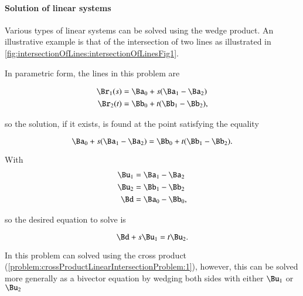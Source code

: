 
\paragraph{Solution of linear systems}

Various types of linear systems can be solved using the wedge product.
An illustrative example is that of the intersection of two lines as illustrated in \cref{fig:intersectionOfLines:intersectionOfLinesFig1}.


In parametric form, the lines in this problem are

\begin{dmath}\label{eqn:SimpleProducts2:1000}
\begin{aligned}
\Br_1(s) &= \Ba_0 + s( \Ba_1 - \Ba_2 ) \\
\Br_2(t) &= \Bb_0 + t( \Bb_1 - \Bb_2 ),
\end{aligned}
\end{dmath}

so the solution, if it exists, is found at the point satisfying the equality

\begin{dmath}\label{eqn:SimpleProducts2:1020}
\Ba_0 + s( \Ba_1 - \Ba_2 ) = \Bb_0 + t( \Bb_1 - \Bb_2 ).
\end{dmath}

With
\begin{dmath}\label{eqn:SimpleProducts2:1040}
\begin{aligned}
\Bu_1 &= \Ba_1 - \Ba_2 \\
\Bu_2 &= \Bb_1 - \Bb_2 \\
\Bd &= \Ba_0 - \Bb_0,
\end{aligned}
\end{dmath}

so the desired equation to solve is

\begin{dmath}\label{eqn:SimpleProducts2:1060}
\Bd + s \Bu_1 = t \Bu_2.
\end{dmath}

In  this problem can solved using the cross product (\cref{problem:crossProductLinearIntersectionProblem:1}), however, this can be solved more generally as a
bivector equation by wedging both sides with either \( \Bu_1 \) or \( \Bu_2 \)

